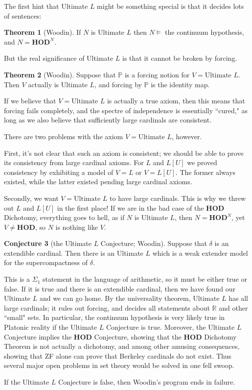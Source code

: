 \documentclass[12pt]{report}
\newcommand{\RR}{\mathbb{R}}
\newcommand{\PP}{\mathbb{P}}
\newcommand{\HOD}{\mathbf{HOD}}
\theoremstyle{definition}
\newtheorem{theorem}{Theorem}[chapter]
\newtheorem{conjecture}[theorem]{Conjecture}
\begin{document}
The first hint that Ultimate $L$ might be something special is that it decides lots of sentences:
\begin{theorem}[Woodin]
If $N$ is Ultimate $L$ then $N \models$ the continuum hypothesis, and $N = \HOD^N$.
\end{theorem}

But the real significance of Ultimate $L$ is that it cannot be broken by forcing.
\begin{theorem}[Woodin]
Suppose that $\PP$ is a forcing notion for $V = \text{Ultimate } L$. Then $V$ actually is Ultimate $L$, and forcing by $\PP$ is the identity map.
\end{theorem}
If we believe that $V = \text{Ultimate } L$ is actually a true axiom, then this means that forcing fails completely, and the spectre of independence is essentially ``cured," as long as we also believe that sufficiently large cardinals are consistent.

There are two problems with the axiom $V = \text{Ultimate } L$, however.

First, it's not clear that such an axiom is consistent; we should be able to prove its consistency from large cardinal axioms. For $L$ and $L[U]$ we proved consistency by exhibiting a model of $V = L$ or $V = L[U]$. The former always existed, while the latter existed pending large cardinal axioms.

Secondly, we want $V = \text{Ultimate } L$ to have large cardinals. This is why we threw out $L$ and $L[U]$ in the first place!
If we are in the bad case of the $\HOD$ Dichotomy, everything goes to hell, as if $N$ is Ultimate $L$, then $N = \HOD^N$, yet $V \neq \HOD$, so $N$ is nothing like $V$.

\begin{conjecture}[the Ultimate $L$ Conjecture; Woodin]
Suppose that $\delta$ is an extendible cardinal. Then there is an Ultimate $L$ which is a weak extender model for the supercompactness of $\delta$.
\end{conjecture}
This is a $\Sigma_1$ statement in the language of arithmetic, so it must be either true or false. If it is true and there is an extendible cardinal, then we have found our Ultimate $L$ and we can go home.
By the universality theorem, Ultimate $L$ has all large cardinals; it rules out forcing, and decides all statements about $\RR$ and other ``small" sets.
In particular, the continuum hypothesis is very likely true in Platonic reality if the Ultimate $L$ Conjecture is true.
Moreover, the Ultimate $L$ Conjecture implies the $\HOD$ Conjecture, showing that the $\HOD$ Dichotomy Theorem is not actually a dichotomy, and among other amusing consequences, showing that ZF alone can prove that Berkeley cardinals do not exist.
Thus several major open problems in set theory would be solved in one fell swoop.

If the Ultimate $L$ Conjecture is false, then Woodin's program ends in failure.



\newpage
\printindex
\end{document}
